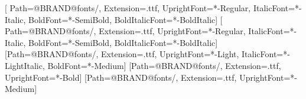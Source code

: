 \usepackage{fontspec}
\setmainfont{FiraSans}[
  Path=@BRAND@fonts/, Extension=.ttf,
  UprightFont=*-Regular, ItalicFont=*-Italic,
  BoldFont=*-SemiBold, BoldItalicFont=*-BoldItalic]
\setsansfont{FiraSans}[
  Path=@BRAND@fonts/, Extension=.ttf,
  UprightFont=*-Regular, ItalicFont=*-Italic,
  BoldFont=*-SemiBold, BoldItalicFont=*-BoldItalic]
\newfontfamily{}[Path=@BRAND@fonts/, Extension=.ttf, UprightFont=*-Light, ItalicFont=*-LightItalic, BoldFont=*-Medium]
\newfontfamily{}[Path=@BRAND@fonts/, Extension=.ttf, UprightFont=*-Bold]
\newfontfamily{}[Path=@BRAND@fonts/, Extension=.ttf, UprightFont=*-Medium]
\linespread{1.12}

\color{ifeink}

\usepackage{titlesec}
\titleformat{\section}{\firabold\LARGE\color{ifepurple}}{\color{ifered}\thesection}{0.6em}{}
\titleformat{\subsection}{\firamedium\large\color{ifepurple}}{\color{ifered}\thesubsection}{0.6em}{}
\titleformat{\subsubsection}{\firamedium\normalsize\color{ifepurple}}{\color{ifered}\thesubsubsection}{0.6em}{}
\newcommand{\sectionbreak}{\addpenalty{-300}}

